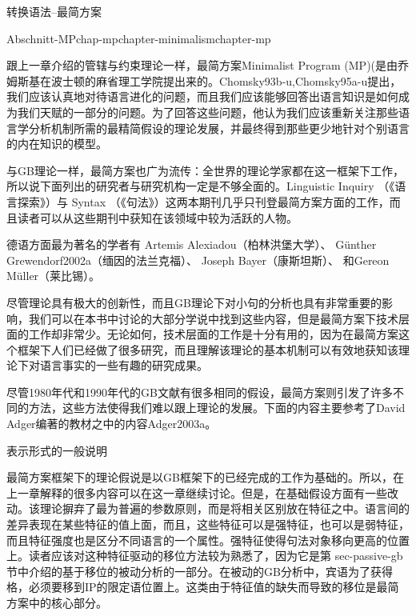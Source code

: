 
转换语法--最简方案

Abschnitt-MPchap-mpchapter-minimalismchapter-mp

跟上一章介绍的管辖与约束理论一样，最简方案Minimalist Program (MP)(是由乔姆斯基在波士顿的麻省理工学院提出来的。Chomsky93b-u,Chomsky95a-u提出，我们应该认真地对待语言进化的问题，而且我们应该能够回答出语言知识是如何成为我们天赋的一部分的问题。为了回答这些问题，他认为我们应该重新关注那些语言学分析机制所需的最精简假设的理论发展，并最终得到那些更少地针对个别语言的内在知识的模型。








与GB理论一样，最简方案也广为流传：全世界的理论学家都在这一框架下工作，所以说下面列出的研究者与研究机构一定是不够全面的。Linguistic Inquiry （《语言探索》）与 Syntax （《句法》）这两本期刊几乎只刊登最简方案方面的工作，而且读者可以从这些期刊中获知在该领域中较为活跃的人物。









德语方面最为著名的学者有
Artemis Alexiadou（柏林洪堡大学）、
Günther Grewendorf2002a（缅因的法兰克福）、
Joseph Bayer（康斯坦斯）、
和Gereon Müller（莱比锡）。






尽管理论具有极大的创新性，而且GB理论下对小句的分析也具有非常重要的影响，我们可以在本书中讨论的大部分学说中找到这些内容，但是最简方案下技术层面的工作却非常少。无论如何，技术层面的工作是十分有用的，因为在最简方案这个框架下人们已经做了很多研究，而且理解该理论的基本机制可以有效地获知该理论下对语言事实的一些有趣的研究成果。















尽管1980年代和1990年代的GB文献有很多相同的假设，最简方案则引发了许多不同的方法，这些方法使得我们难以跟上理论的发展。下面的内容主要参考了David Adger编著的教材之中的内容Adger2003a。




表示形式的一般说明


最简方案框架下的理论假说是以GB框架下的已经完成的工作为基础的。所以，在上一章解释的很多内容可以在这一章继续讨论。但是，在基础假设方面有一些改动。该理论摒弃了最为普遍的参数原则，而是将相关区别放在特征之中。语言间的差异表现在某些特征的值上面，而且，这些特征可以是强特征，也可以是弱特征，而且特征强度也是区分不同语言的一个属性。强特征使得句法对象移向更高的位置上。读者应该对这种特征驱动的移位方法较为熟悉了，因为它是第 sec-passive-gb节中介绍的基于移位的被动分析的一部分。在被动的GB分析中，宾语为了获得格，必须要移到IP的限定语位置上。这类由于特征值的缺失而导致的移位是最简方案中的核心部分。












